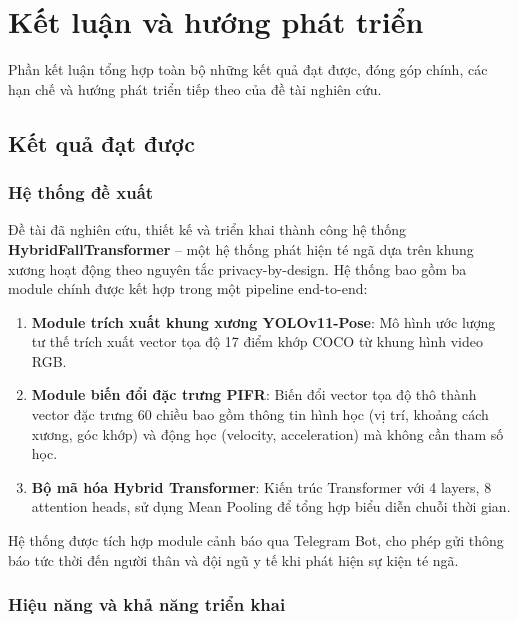 \chapter{Kết luận và hướng phát triển}
\label{chap:conclusion}

Phần kết luận tổng hợp toàn bộ những kết quả đạt được, đóng góp chính, các hạn chế và hướng phát triển tiếp theo của đề tài nghiên cứu.

\section{Kết quả đạt được}
\label{sec:achievements}

\subsection{Hệ thống đề xuất}
\label{sec:achievements_system}

Đề tài đã nghiên cứu, thiết kế và triển khai thành công hệ thống \textbf{HybridFallTransformer} -- một hệ thống phát hiện té ngã dựa trên khung xương hoạt động theo nguyên tắc privacy-by-design. Hệ thống bao gồm ba module chính được kết hợp trong một pipeline end-to-end:

\begin{enumerate}
    \item \textbf{Module trích xuất khung xương YOLOv11-Pose}: Mô hình ước lượng tư thế trích xuất vector tọa độ 17 điểm khớp COCO từ khung hình video RGB.
    
    \item \textbf{Module biến đổi đặc trưng PIFR}: Biến đổi vector tọa độ thô thành vector đặc trưng 60 chiều bao gồm thông tin hình học (vị trí, khoảng cách xương, góc khớp) và động học (velocity, acceleration) mà không cần tham số học.
    
    \item \textbf{Bộ mã hóa Hybrid Transformer}: Kiến trúc Transformer với 4 layers, 8 attention heads, sử dụng Mean Pooling để tổng hợp biểu diễn chuỗi thời gian.
\end{enumerate}

Hệ thống được tích hợp module cảnh báo qua Telegram Bot, cho phép gửi thông báo tức thời đến người thân và đội ngũ y tế khi phát hiện sự kiện té ngã.

\subsection{Hiệu năng và khả năng triển khai}
\label{sec:achievements_performance}


